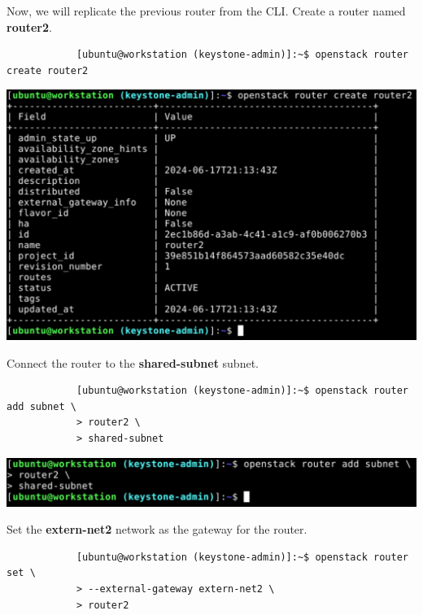 \documentclass[letterpaper, 12pt]{article}
\begin{document}
\begin{enumerate}
    \begin{labstep}
        Now, we will replicate the previous router from the CLI.
        Create a router named \textbf{router2}.
        \begin{lstlisting}
            [ubuntu@workstation (keystone-admin)]:~$ openstack router create router2
        \end{lstlisting}

        \begin{center}
            \includegraphics[width=\linewidth]{images/part2/step12.png}
        \end{center}
    \end{labstep}

    \begin{labstep}
        Connect the router to the \textbf{shared-subnet} subnet.
        \begin{lstlisting}
            [ubuntu@workstation (keystone-admin)]:~$ openstack router add subnet \
            > router2 \
            > shared-subnet
        \end{lstlisting}

        \begin{center}
            \includegraphics[width=\linewidth]{images/part2/step13.png}
        \end{center}
    \end{labstep}

    \begin{labstep}
        Set the \textbf{extern-net2} network as the gateway for the router.
        \begin{lstlisting}
            [ubuntu@workstation (keystone-admin)]:~$ openstack router set \
            > --external-gateway extern-net2 \
            > router2
        \end{lstlisting}


\end{labstep}
\end{enumerate}
\end{document}
